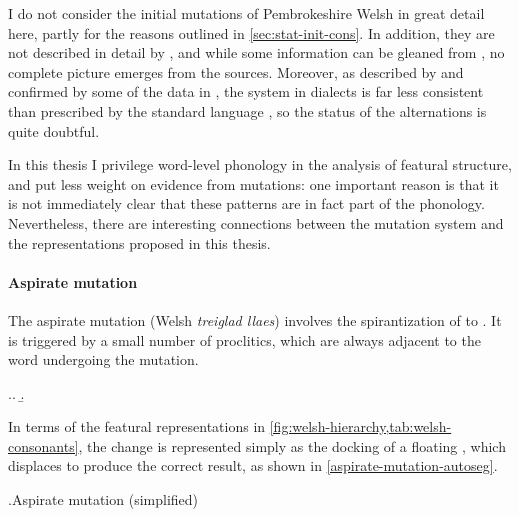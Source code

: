 I do not consider the initial mutations of Pembrokeshire Welsh in great detail here, partly for the reasons outlined in \cref{sec:stat-init-cons}. In addition, they are not described in detail by \citet{awbery86:_pembr_welsh}, and while some information can be gleaned from \citet{thomas00:_welsh}, no complete picture emerges from the sources. Moreover, as described by \citet{awbery86:_moves_welsh} and confirmed by some of the data in \citet{thomas00:_welsh}, the system in dialects is far less consistent than prescribed by the standard language \citep[\cf also \eg][]{thomas}, so the status of the alternations is quite doubtful.

In this thesis I privilege word\hyp level phonology in the analysis of featural structure, and put less weight on evidence from mutations: one important reason is that it is not immediately clear that these patterns are in fact part of the phonology. Nevertheless, there are interesting connections between the mutation system and the representations proposed in this thesis.

\paragraph{Aspirate mutation}
\label{sec:aspirate-mutation}

The aspirate mutation (Welsh \emph{treiglad llaes}) involves the spirantization of \ipa{[p~t~k]} to \ipa{[f~θ~χ]}. It is triggered by a small number of proclitics, which are always adjacent to the word undergoing the mutation.

\ex.\a.
\b.\hfill \citep[\emph{sub voce}]{thomas00:_welsh}

In terms of the featural representations in \cref{fig:welsh-hierarchy,tab:welsh-consonants}, the change is represented simply as the docking of a floating , which displaces  to produce the correct result, as shown in \ref{aspirate-mutation-autoseg}.

\ex.\label{aspirate-mutation-autoseg}Aspirate mutation (simplified)\\

